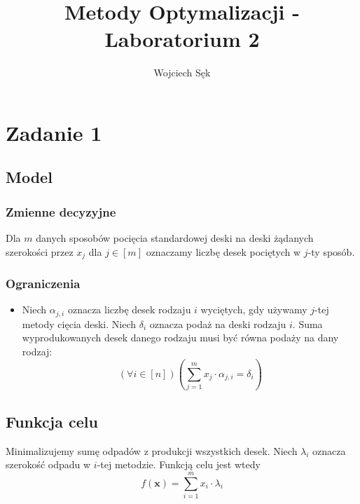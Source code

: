 \documentclass{article}
\title{Metody Optymalizacji - Laboratorium 2}
\author{Wojciech Sęk}
\def\x{\textbf{x}}
\begin{document}
\maketitle
\section{Zadanie 1}
\subsection{Model}

\subsubsection{Zmienne decyzyjne}
Dla $m$ danych sposobów pocięcia standardowej deski na deski żądanych szerokości przez $x_j$ dla $j\in[m]$ oznaczamy liczbę desek pociętych w $j$-ty sposób.

\subsubsection{Ograniczenia}
\begin{itemize}
\item Niech $\alpha_{j,i}$ oznacza liczbę desek rodzaju $i$ wyciętych, gdy używamy $j$-tej metody cięcia deski. Niech $\delta_i$ oznacza podaż na deski rodzaju $i$. Suma wyprodukowanych desek danego rodzaju musi być równa podaży na dany rodzaj:
$$(\forall i \in [n])\left(\sum_{j=1}^m x_j \cdot \alpha_{j,i} = \delta_i\right)$$
\end{itemize}

\subsection{Funkcja celu}
Minimalizujemy sumę odpadów z produkcji wszystkich desek. Niech $\lambda_i$ oznacza szerokość odpadu w $i$-tej metodzie. Funkcją celu jest wtedy
$$f(\x)=\sum_{i=1}^m x_i \cdot \lambda_{i}$$
\end{document}
